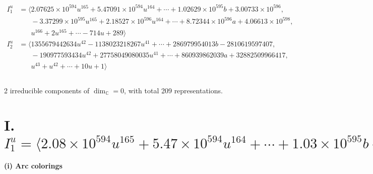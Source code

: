 \documentclass[1p]{elsarticle_modified}
\theoremstyle{definition}
\begin{document}
\begin{align*}
I^u_{1}&=\langle 
2.07625\times10^{594} u^{165}+5.47091\times10^{594} u^{164}+\cdots+1.02629\times10^{595} b+3.00733\times10^{596},\\
\phantom{I^u_{1}}&\phantom{= \langle  }-3.37299\times10^{595} u^{165}+2.18527\times10^{596} u^{164}+\cdots+8.72344\times10^{596} a+4.06613\times10^{598},\\
\phantom{I^u_{1}}&\phantom{= \langle  }u^{166}+2 u^{165}+\cdots-714 u+289\rangle \\
I^u_{2}&=\langle 
1355679442634 u^{42}-1138023218267 u^{41}+\cdots+286979954013 b-2810619597407,\\
\phantom{I^u_{2}}&\phantom{= \langle  }-190977593434 u^{42}+27758049080035 u^{41}+\cdots+860939862039 a+32882509966417,\\
\phantom{I^u_{2}}&\phantom{= \langle  }u^{43}+u^{42}+\cdots+10 u+1\rangle \\
\\
\end{align*}
\raggedright * 2 irreducible components of $\dim_{\mathbb{C}}=0$, with total 209 representations.\\
\newpage
\renewcommand{\arraystretch}{1}
\centering \section*{I. $I^u_{1}= \langle 2.08\times10^{594} u^{165}+5.47\times10^{594} u^{164}+\cdots+1.03\times10^{595} b+3.01\times10^{596},\;-3.37\times10^{595} u^{165}+2.19\times10^{596} u^{164}+\cdots+8.72\times10^{596} a+4.07\times10^{598},\;u^{166}+2 u^{165}+\cdots-714 u+289 \rangle$}
\flushleft \textbf{(i) Arc colorings}\\
\end{document}
